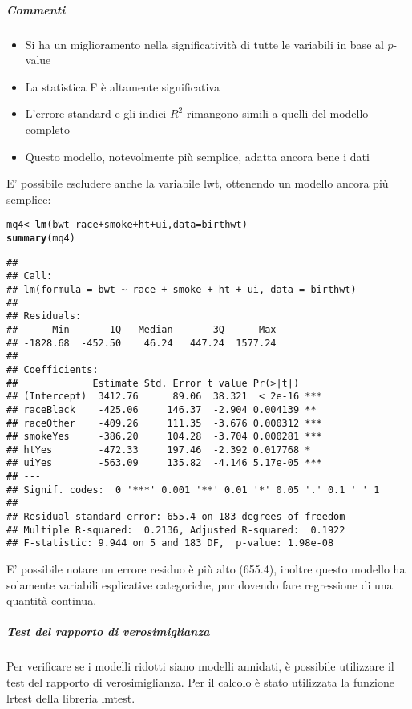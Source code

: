 \documentclass{article}\usepackage[]{graphicx}\usepackage[]{color}
\makeatletter
\newcommand{\hlopt}[1]{\textcolor[rgb]{0,0,0}{#1}}%
\newcommand{\hlstd}[1]{\textcolor[rgb]{0.345,0.345,0.345}{#1}}%
\newcommand{\hlkwb}[1]{\textcolor[rgb]{0.69,0.353,0.396}{#1}}%
\newcommand{\hlkwc}[1]{\textcolor[rgb]{0.333,0.667,0.333}{#1}}%
\newcommand{\hlkwd}[1]{\textcolor[rgb]{0.737,0.353,0.396}{\textbf{#1}}}%
\newenvironment{kframe}{%
 \def\at@end@of@kframe{}%
 \ifinner\ifhmode%
  \def\at@end@of@kframe{\end{minipage}}%
  \begin{minipage}{\columnwidth}%
 \fi\fi%
 \def\FrameCommand##1{\hskip\@totalleftmargin \hskip-\fboxsep
 \colorbox{shadecolor}{##1}\hskip-\fboxsep
     \hskip-\linewidth \hskip-\@totalleftmargin \hskip\columnwidth}%
 \MakeFramed {\advance\hsize-\width
   \@totalleftmargin\z@ \linewidth\hsize
   \@setminipage}}%
 {\par\unskip\endMakeFramed%
 \at@end@of@kframe}
\newenvironment{knitrout}{}{} %
\makeatother
\begin{document}
\subparagraph{Commenti}
\begin{itemize}
\item Si ha un miglioramento nella significatività di tutte le variabili in base al $p$-value
\item La statistica F è altamente significativa
\item L'errore standard e gli indici $R^2$ rimangono simili a quelli del modello completo
\item Questo modello, notevolmente più semplice, adatta ancora bene i dati
\end{itemize}

E' possibile escludere anche la variabile lwt, ottenendo un modello ancora più semplice:

\begin{knitrout}
\color{fgcolor}\begin{kframe}
\begin{alltt}
\hlstd{mq4} \hlkwb{<-} \hlkwd{lm}\hlstd{(bwt} \hlopt{~}  \hlstd{race} \hlopt{+} \hlstd{smoke} \hlopt{+} \hlstd{ht} \hlopt{+} \hlstd{ui,}\hlkwc{data}\hlstd{=birthwt)}
\hlkwd{summary}\hlstd{(mq4)}
\end{alltt}
\begin{verbatim}
## 
## Call:
## lm(formula = bwt ~ race + smoke + ht + ui, data = birthwt)
## 
## Residuals:
##      Min       1Q   Median       3Q      Max 
## -1828.68  -452.50    46.24   447.24  1577.24 
## 
## Coefficients:
##             Estimate Std. Error t value Pr(>|t|)    
## (Intercept)  3412.76      89.06  38.321  < 2e-16 ***
## raceBlack    -425.06     146.37  -2.904 0.004139 ** 
## raceOther    -409.26     111.35  -3.676 0.000312 ***
## smokeYes     -386.20     104.28  -3.704 0.000281 ***
## htYes        -472.33     197.46  -2.392 0.017768 *  
## uiYes        -563.09     135.82  -4.146 5.17e-05 ***
## ---
## Signif. codes:  0 '***' 0.001 '**' 0.01 '*' 0.05 '.' 0.1 ' ' 1
## 
## Residual standard error: 655.4 on 183 degrees of freedom
## Multiple R-squared:  0.2136,	Adjusted R-squared:  0.1922 
## F-statistic: 9.944 on 5 and 183 DF,  p-value: 1.98e-08
\end{verbatim}
\end{kframe}
\end{knitrout}

E' possibile notare un errore residuo è più alto (655.4), inoltre questo modello ha solamente variabili esplicative categoriche, pur dovendo fare regressione di una quantità continua.

\subparagraph{Test del rapporto di verosimiglianza}
Per verificare se i modelli ridotti siano modelli annidati, è possibile utilizzare il test del rapporto di verosimiglianza. 
Per il calcolo è stato utilizzata la funzione lrtest della libreria lmtest.
\end{document}
